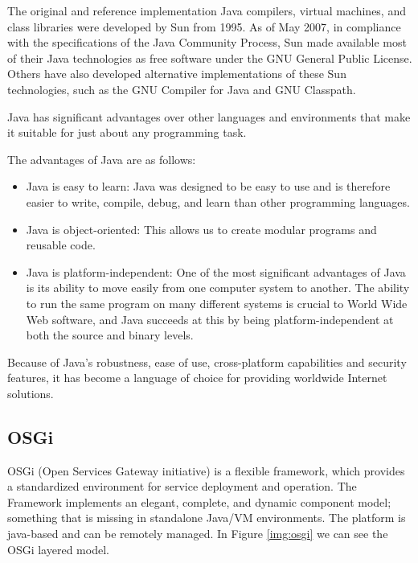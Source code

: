 The original and reference implementation Java compilers, virtual machines, 
and class libraries were developed by Sun from 1995. As of May 2007, in
compliance  with the specifications of the Java Community Process, Sun made 
available most of their Java technologies as free software under the GNU
General  Public License. Others have also developed alternative implementations
of these Sun technologies, such as the GNU Compiler for Java and GNU Classpath.

Java has significant advantages over other languages and environments  that
make it suitable for just about any programming task.

The advantages of Java are as follows:
\begin{itemize}
  \item Java is easy to learn: Java was designed to be easy to use and is
  therefore easier to write, compile, debug, and learn than other programming
  languages.
  \item Java is object-oriented: This allows us to create modular programs and
  reusable code.
  \item Java is platform-independent: One of the most significant
  advantages of Java is its ability to move easily from one computer system  to
  another. The ability to run the same program on many different systems is 
  crucial to World Wide Web software, and Java succeeds at this by being 
  platform-independent at both the source and binary levels.
\end{itemize}

Because of Java's robustness, ease of use, cross-platform  capabilities and
security features, it has become a language of choice for providing  worldwide
Internet solutions.


\subsection{OSGi}
\label{subsec:tech-osgi}
OSGi (Open Services Gateway initiative) is a flexible framework, which provides
a standardized environment for service deployment and operation. 
The Framework implements an elegant, complete, and dynamic component
model; something that is missing in standalone Java/VM environments. The
platform is java-based and can be remotely managed.
In Figure \ref{img:osgi} we can see the OSGi layered model.

